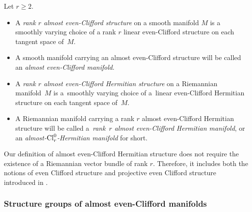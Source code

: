 \documentclass[10pt,a4paper]{amsart}
\numberwithin{equation}{section}
\begin{document}
\begin{Definition} Let $r\geq 2$.
\begin{itemize}\itemsep=0pt
 \item A {\em rank $r$ almost even-Clifford structure} on a smooth manifold $M$ is a smoothly varying choice of a rank $r$ linear even-Clif\/ford structure on each tangent space of~$M$.

\item A smooth manifold carrying an almost even-Clif\/ford structure will be called an {\em almost even-Clifford manifold}.

\item A {\em rank $r$ almost even-Clifford Hermitian structure} on a Riemannian manifold~$M$ is \linebreak a~smoothly varying choice of a~linear even-Clif\/ford Hermitian structure on each tangent space of~$M$.

\item A Riemannian manifold carrying a rank $r$ almost even-Clif\/ford Hermitian structure will be called a~{\em rank~$r$ almost even-Clifford Hermitian manifold}, or an {\em almost-${\rm Cl}_r^0$-Hermitian manifold} for short.
\end{itemize}
\end{Definition}

\begin{Remark}
Our def\/inition of almost even-Clif\/ford Hermitian structure does not require the existence of a Riemannian vector bundle of rank $r$. Therefore, it includes both the notions of even Clif\/ford structure and projective even Clif\/ford structure introduced in \cite[Def\/inition~2.2 and Remark~2.5]{Moroianu-Semmelmann}.
\end{Remark}

\subsubsection{Structure groups of almost even-Clif\/ford manifolds}\label{subsubsection: structure groups}
\end{document}
